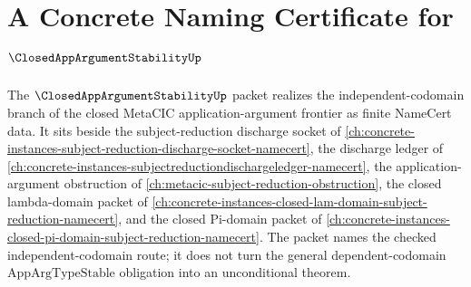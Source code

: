 \chapter{A Concrete Naming Certificate for $\ClosedAppArgumentStabilityUp$}
\label{ch:concrete-instances-closed-app-argument-stability-namecert}

The $\ClosedAppArgumentStabilityUp$ packet realizes the independent-codomain branch of the closed MetaCIC application-argument frontier as finite NameCert data. It sits beside the subject-reduction discharge socket of \autoref{ch:concrete-instances-subject-reduction-discharge-socket-namecert}, the discharge ledger of \autoref{ch:concrete-instances-subjectreductiondischargeledger-namecert}, the application-argument obstruction of \autoref{ch:metacic-subject-reduction-obstruction}, the closed lambda-domain packet of \autoref{ch:concrete-instances-closed-lam-domain-subject-reduction-namecert}, and the closed Pi-domain packet of \autoref{ch:concrete-instances-closed-pi-domain-subject-reduction-namecert}. The packet names the checked independent-codomain route; it does not turn the general dependent-codomain $\mathrm{AppArgTypeStable}$ obligation into an unconditional theorem.

